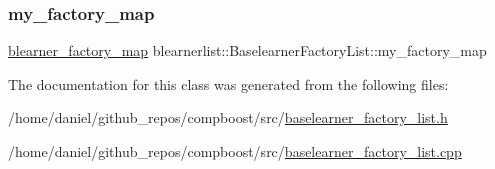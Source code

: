 \subsubsection{\texorpdfstring{my\+\_\+factory\+\_\+map}{my\_factory\_map}}
{\footnotesize\ttfamily \hyperlink{baselearner__factory__list_8h_a058570e00ae11b882cfed36eb40be025}{blearner\+\_\+factory\+\_\+map} blearnerlist\+::\+Baselearner\+Factory\+List\+::my\+\_\+factory\+\_\+map\hspace{0.3cm}{\ttfamily [private]}}



The documentation for this class was generated from the following files\+:\begin{DoxyCompactItemize}
\item 
/home/daniel/github\+\_\+repos/compboost/src/\hyperlink{baselearner__factory__list_8h}{baselearner\+\_\+factory\+\_\+list.\+h}\item 
/home/daniel/github\+\_\+repos/compboost/src/\hyperlink{baselearner__factory__list_8cpp}{baselearner\+\_\+factory\+\_\+list.\+cpp}\end{DoxyCompactItemize}
